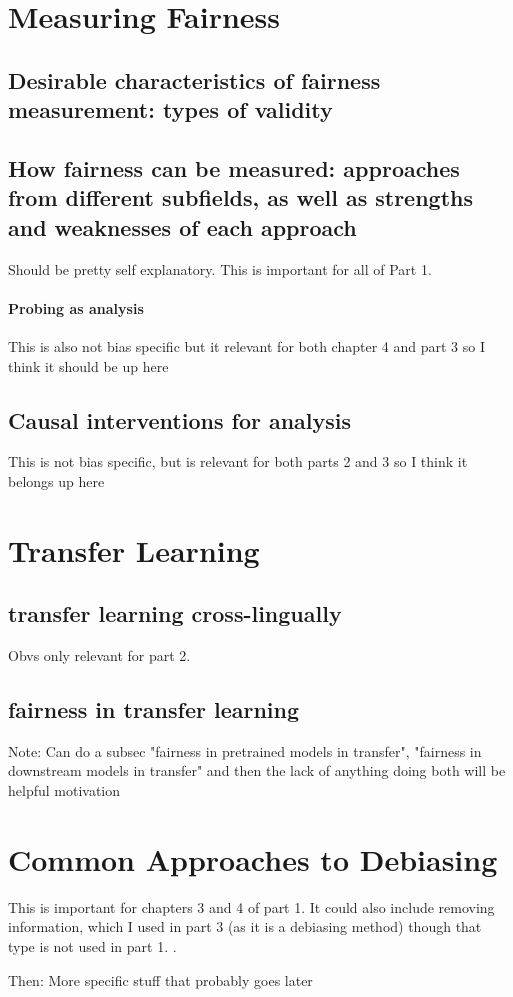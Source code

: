 \section{Measuring Fairness}
\subsection{Desirable characteristics of fairness measurement: types of validity}

\subsection{How fairness can be measured: approaches from different subfields, as well as strengths and weaknesses of each approach} Should be pretty self explanatory. This is important for all of Part 1.

\paragraph{Probing as analysis}
This is also not bias specific but it relevant for both chapter 4 and part 3 so I think it should be up here

\subsection{Causal interventions for analysis}
This is not bias specific, but is relevant for both parts 2 and 3 so I think it belongs up here


\section{Transfer Learning}
\subsection{transfer learning  cross-lingually}
Obvs only relevant for part 2.
\subsection{fairness in transfer learning}

Note: Can do a subsec "fairness in pretrained models in transfer", "fairness in downstream models in transfer" and then the lack of anything doing both will be helpful motivation



\section{Common Approaches to Debiasing}
This is important for chapters 3 and 4 of part 1. It could also include removing information, which I used in part 3 (as it is a debiasing method) though that type is not used in part 1. 
.

Then: More specific stuff that probably goes later
